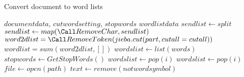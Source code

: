 \label{alg:Convertdocumenttowordlists}
\renewcommand{\algorithmicrequire}{\textbf{input:}}
\renewcommand{\algorithmicensure}{\textbf{output:}}

\begin{algorithm}

    \caption{Convert document to word lists}
    \begin{algorithmic}[1]
        \Require $document data$, $cut word setting$, $stop words$
        \Ensure  $word list data$
            \State $sendlist \gets split$
            \State $sendlist \gets map(\Call RemoveChar, sendlist)$
            \State{}
                      \State $ word2dlist = \Call RemoveToken(jieba.cut(part, cutall=cutall)) $
            \State $ wordlist = sum(word2dlist,[])$
            \State{}
        \EndFunction
        \State
            \State $wordslist \gets list(words)$
            \State $stopwords \gets GetStopWords()$
            \State{}
                      \State {}
                    	             \State $wordslist \gets pop(i)$
                      \State \Else
                                   \State $wordslist \gets pop(i)$                  
            \State{}
        \EndFunction
        \State
            \State $file \gets open(path)$
            \State{}
        \EndFunction
        \State
            \State $text \gets remove(not word symbol)$
            \State{}
        \EndFunction
    \end{algorithmic}
\end{algorithm}

